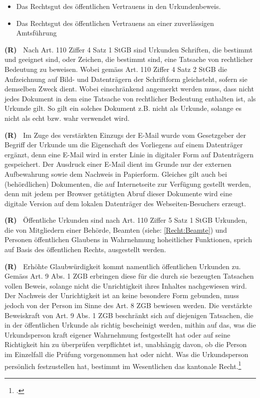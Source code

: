 \documentclass[paper=a4,fontsize=12pt, oneside, numbers=noenddot]{scrbook}
\newcounter{rz}
\newcommand{\Rz}{
	\addtocounter{rz}{1}\textbf{(R\arabic{rz})~}
}
\begin{document}
\begin{itemize}[noitemsep]\setlength\itemsep{0.3em}
\item Das Rechtsgut des öffentlichen Vertrauens in den Urkundenbeweis.
\item Das Rechtsgut des öffentlichen Vertrauens an einer zuverlässigen Amtsführung
\end{itemize} 

\Rz Nach Art. 110 Ziffer 4 Satz 1 StGB sind Urkunden Schriften, die bestimmt und geeignet sind, oder Zeichen, die bestimmt sind, eine Tatsache von rechtlicher Bedeutung zu beweisen. Wobei  gemäss Art. 110 Ziffer 4 Satz 2 StGB die Aufzeichnung auf Bild- und Datenträgern der Schriftform gleichsteht, sofern sie demselben Zweck dient. Wobei einschränkend angemerkt werden muss, dass nicht jedes Dokument in dem eine Tatsache von rechtlicher Bedeutung enthalten ist, als Urkunde gilt. So gilt ein solches Dokument z.B. nicht als Urkunde, solange es nicht als echt bzw. wahr verwendet wird. 

\Rz Im Zuge des verstärkten Einzugs der E-Mail wurde vom Gesetzgeber der Begriff der Urkunde um die Eigenschaft des Vorliegens auf einem Datenträger ergänzt, denn eine E-Mail wird in erster Linie in digitaler Form auf Datenträgern gespeichert. Der Ausdruck einer E-Mail dient im Grunde nur der externen Aufbewahrung sowie dem Nachweis in Papierform. Gleiches gilt auch bei (behördlichen) Dokumenten, die auf Internetseite zur Verfügung gestellt werden, denn mit jedem per Browser getätigten Abruf dieser Dokumente wird eine digitale Version auf dem lokalen Datenträger des Webseiten-Besuchers erzeugt. 

\Rz Öffentliche Urkunden sind nach Art. 110 Ziffer 5 Satz 1 StGB  Urkunden, die von Mitgliedern einer Behörde, Beamten (siehe: \ref{Recht:Beamte})  und Personen öffentlichen Glaubens in Wahrnehmung hoheitlicher Funktionen, sprich auf Basis des öffentlichen Rechts, ausgestellt werden. 

\Rz Erhöhte Glaubwürdigkeit kommt namentlich öffentlichen Urkunden zu. Gemäss Art. 9 Abs. 1 ZGB erbringen diese für die durch sie bezeugten Tatsachen vollen Beweis, solange nicht die Unrichtigkeit ihres Inhaltes nachgewiesen wird. Der Nachweis der Unrichtigkeit ist an keine besondere Form gebunden, muss jedoch von der Person im Sinne des Art. 8 ZGB bewiesen werden. Die verstärkte Beweiskraft von Art. 9 Abs. 1 ZGB beschränkt sich auf diejenigen Tatsachen, die in der öffentlichen Urkunde als richtig bescheinigt werden, mithin auf das, was die Urkundsperson kraft eigener Wahrnehmung festgestellt hat oder auf seine Richtigkeit hin zu überprüfen verpflichtet ist, unabhängig davon, ob die Person im Einzelfall die Prüfung vorgenommen hat oder nicht. Was die Urkundsperson persönlich festzustellen hat, bestimmt im Wesentlichen das kantonale Recht.\footcite{BGE113IV77}
\end{document}
